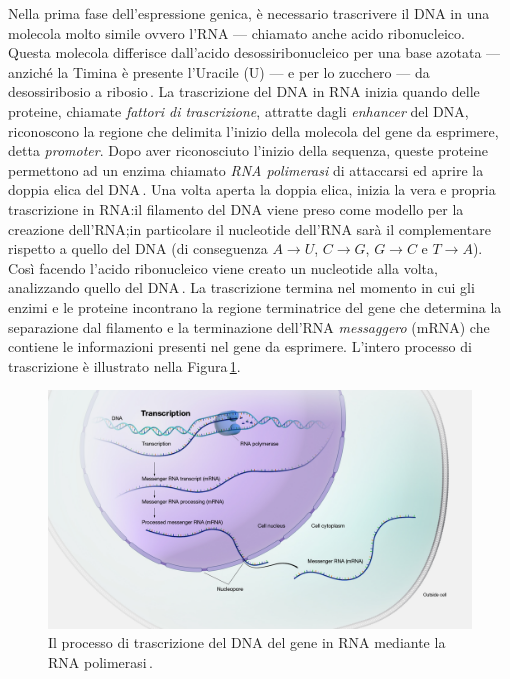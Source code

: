 Nella prima fase dell'espressione genica, è necessario trascrivere il \acs{DNA} in una molecola molto simile ovvero l'\acs{RNA} — chiamato anche acido ribonucleico. Questa molecola differisce dall'acido desossiribonucleico per una base azotata — anziché la Timina è presente l'Uracile (U) — e per lo zucchero — da desossiribosio a ribosio\,\cite{alberts2002dna}. La trascrizione del \acs{DNA} in \acs{RNA} inizia quando delle proteine, chiamate \textsl{fattori di trascrizione}, attratte dagli \textit{enhancer} del \acs{DNA}, riconoscono la regione che delimita l'inizio della molecola del gene da esprimere, detta \textit{promoter}. Dopo aver riconosciuto l'inizio della sequenza, queste proteine permettono ad un enzima chiamato \textsl{\acs{RNA} polimerasi} di attaccarsi ed aprire la doppia elica del \acs{DNA}\,\cite{cramer2019organization}. Una volta aperta la doppia elica, inizia la vera e propria trascrizione in \acs{RNA}:\@ il filamento del \acs{DNA} viene preso come modello per la creazione dell'\acs{RNA};\@ in particolare il nucleotide dell'\acs{RNA} sarà il complementare rispetto a quello del \acs{DNA} (di conseguenza $A\rightarrow U$, $C\rightarrow G$, $G\rightarrow C$ e $T\rightarrow A$). Così facendo l'acido ribonucleico viene creato un nucleotide alla volta, analizzando quello del \acs{DNA}\,\cite{alberts2002dna}. La trascrizione termina nel momento in cui gli enzimi e le proteine incontrano la regione terminatrice del gene che determina la separazione dal filamento e la terminazione dell'\acs{RNA} \textsl{messaggero} (\acs{mRNA}) che contiene le informazioni presenti nel gene da esprimere. L'intero processo di trascrizione è illustrato nella Figura\,\ref{fig:dna-transcription}.

\begin{figure}[b!]
    \centering
    \includegraphics[width=\textwidth]{assets/imgs/dna-transcription.jpg}
    \caption[Il processo di trascrizione del \acs{DNA} in \acs{RNA}.]{Il processo di trascrizione del \acs{DNA} del gene in \acs{RNA} mediante la \acs{RNA} polimerasi\,\cite{nhgri_transcription_image}.}\label{fig:dna-transcription}
\end{figure}


